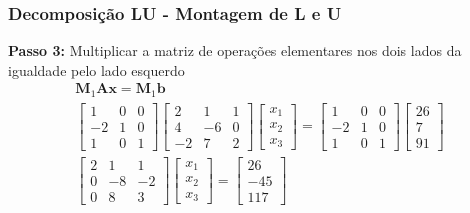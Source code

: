 \documentclass{beamer}
\theoremstyle{mystyle}
\begin{document}
\begin{frame}
	\frametitle{Decomposição LU - Montagem de L e U}
	\textbf{Passo 3:} Multiplicar a matriz de operações elementares nos dois lados da igualdade pelo lado esquerdo
	\begin{gather*}
		\mathbf{M}_{1}\mathbf{Ax} = \mathbf{M}_{1}\mathbf{b}\\
		\left[
		\begin{array}{ccc}
			1 & 0 & 0  \\
			-2 & 1 & 0  \\
			1 & 0 & 1
		\end{array}
		\right]
		\left[
		\begin{array}{ccc}
			2 & 1 & 1  \\
			4 & -6 & 0  \\
			-2 & 7 & 2
		\end{array}
		\right] 
		\begin{bmatrix} x_{1} \\ x_{2} \\ x_{3} \end{bmatrix}
		=
		\left[
		\begin{array}{ccc}
			1 & 0 & 0  \\
			-2 & 1 & 0  \\
			1 & 0 & 1
		\end{array}
		\right]
		\begin{bmatrix} 26 \\ 7 \\ 91 \end{bmatrix}\\
		\left[
		\begin{array}{ccc}
			2 & 1 & 1  \\
			0 & -8 & -2  \\
			0 & 8 & 3
		\end{array}
		\right] 
		\begin{bmatrix} x_{1} \\ x_{2} \\ x_{3} \end{bmatrix}
		=
		\begin{bmatrix} 26 \\ -45 \\ 117 \end{bmatrix}
	\end{gather*}
\end{frame}
\end{document}
